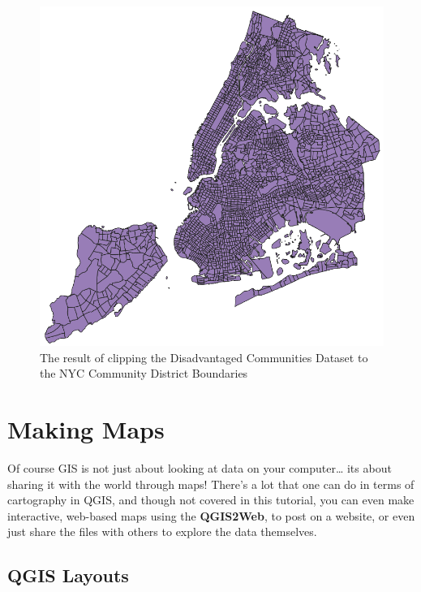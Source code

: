 \documentclass[
  letterpaper,
  DIV=11,
  numbers=noendperiod]{scrreprt}
\begin{document}
\begin{figure}

{\centering \includegraphics{./images/DisadvantagedCommunities_Clipped.png}

}

\caption{The result of clipping the Disadvantaged Communities Dataset to
the NYC Community District Boundaries}

\end{figure}


\hypertarget{making-maps}{%
\chapter{Making Maps}\label{making-maps}}

Of course GIS is not just about looking at data on your computer\ldots{}
its about sharing it with the world through maps! There's a lot that one
can do in terms of cartography in QGIS, and though not covered in this
tutorial, you can even make interactive, web-based maps using the
\textbf{QGIS2Web}, to post on a website, or even just share the files
with others to explore the data themselves.

\hypertarget{qgis-layouts}{%
\section{QGIS Layouts}\label{qgis-layouts}}
\end{document}
